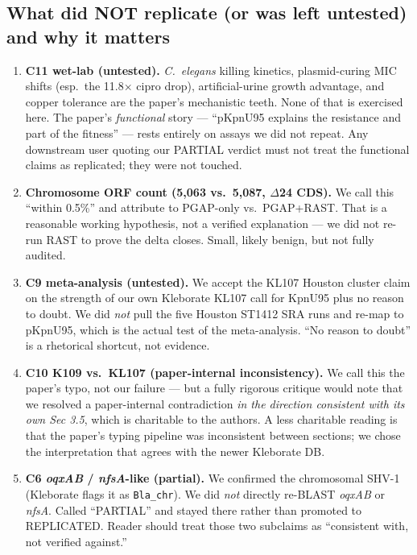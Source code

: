 \documentclass[11pt]{article}
\begin{document}
\subsection{What did NOT replicate (or was left untested) and why it matters}
\begin{enumerate}
  \item \textbf{C11 wet-lab (untested).} \textit{C.\ elegans} killing kinetics, plasmid-curing MIC shifts (esp.\ the 11.8$\times$ cipro drop), artificial-urine growth advantage, and copper tolerance are the paper's mechanistic teeth. None of that is exercised here. The paper's \emph{functional} story --- ``pKpnU95 explains the resistance and part of the fitness'' --- rests entirely on assays we did not repeat. Any downstream user quoting our PARTIAL verdict must not treat the functional claims as replicated; they were not touched.
  \item \textbf{Chromosome ORF count (5{,}063 vs.\ 5{,}087, $\Delta$24 CDS).} We call this ``within 0.5\%'' and attribute to PGAP-only vs.\ PGAP+RAST. That is a reasonable working hypothesis, not a verified explanation --- we did not re-run RAST to prove the delta closes. Small, likely benign, but not fully audited.
  \item \textbf{C9 meta-analysis (untested).} We accept the KL107 Houston cluster claim on the strength of our own Kleborate KL107 call for KpnU95 plus no reason to doubt. We did \emph{not} pull the five Houston ST1412 SRA runs and re-map to pKpnU95, which is the actual test of the meta-analysis. ``No reason to doubt'' is a rhetorical shortcut, not evidence.
  \item \textbf{C10 K109 vs.\ KL107 (paper-internal inconsistency).} We call this the paper's typo, not our failure --- but a fully rigorous critique would note that we resolved a paper-internal contradiction \emph{in the direction consistent with its own Sec 3.5}, which is charitable to the authors. A less charitable reading is that the paper's typing pipeline was inconsistent between sections; we chose the interpretation that agrees with the newer Kleborate DB.
  \item \textbf{C6 \textit{oqxAB} / \textit{nfsA}-like (partial).} We confirmed the chromosomal SHV-1 (Kleborate flags it as \texttt{Bla\_chr}). We did \emph{not} directly re-BLAST \textit{oqxAB} or \textit{nfsA}. Called ``PARTIAL'' and stayed there rather than promoted to REPLICATED. Reader should treat those two subclaims as ``consistent with, not verified against.''
\end{enumerate}
\end{document}
